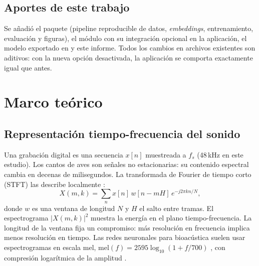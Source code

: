 \documentclass[11pt,a4paper]{article}
\begin{document}
\subsection{Aportes de este trabajo}
Se añadió el paquete  (pipeline reproducible de datos, \emph{embeddings}, entrenamiento, evaluación y figuras),
el módulo  con su integración opcional en la aplicación, el modelo exportado en
 y este informe. Todos los cambios en archivos existentes son aditivos: con la nueva opción desactivada,
la aplicación se comporta exactamente igual que antes.

\section{Marco teórico}
\subsection{Representación tiempo-frecuencia del sonido}
Una grabación digital es una secuencia $x[n]$ muestreada a $f_s$ (48\,kHz en este estudio). Los cantos de aves son señales no
estacionarias: su contenido espectral cambia en decenas de milisegundos. La transformada de Fourier de tiempo corto (STFT) las describe localmente
\citep{oppenheim2010dsp}:
\begin{equation}
  X(m,k) = \sum_{n} x[n]\, w[n - mH]\, e^{-j 2\pi k n / N},
\end{equation}
donde $w$ es una ventana de longitud $N$ y $H$ el salto entre tramas. El espectrograma $|X(m,k)|^2$ muestra la energía en el
plano tiempo-frecuencia. La longitud de la ventana fija un compromiso: más resolución en frecuencia implica menos resolución en tiempo.
Las redes neuronales para bioacústica suelen usar espectrogramas en escala mel, $\mathrm{mel}(f) = 2595 \log_{10}(1 + f/700)$
\citep{stevens1937mel}, con compresión logarítmica de la amplitud \citep{stowell2022review}.
\end{document}
